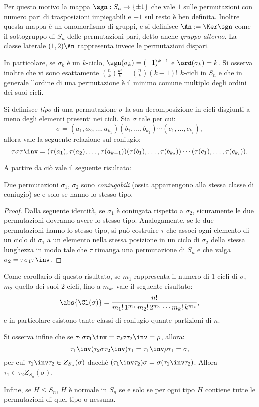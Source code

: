 \documentclass[12pt]{scrartcl}
\begin{document}
	Per questo motivo la mappa $\sgn : S_n \to \{\pm 1\}$ che vale $1$ sulle
	permutazioni con numero pari di trasposizioni impiegabili e $-1$ sul resto
	è ben definita. Inoltre questa mappa è un omomorfismo di gruppi, e si
	definisce $\An := \Ker \sgn$ come il sottogruppo di $S_n$ delle permutazioni
	pari, detto anche \textit{gruppo alterno}. La classe laterale $(1, 2) \An$
	rappresenta invece le permutazioni dispari. \medskip
	
	
	In particolare, se $\sigma_k$ è un $k$-ciclo, $\sgn(\sigma_k) = (-1)^{k-1}$ e $\ord(\sigma_k) = k$. Si osserva inoltre che vi sono esattamente $\binom{n}{k} \frac{k!}{k} =
	\binom{n}{k} (k-1)!$ $k$-cicli in $S_n$ e che in generale l'ordine
	di una permutazione è il minimo comune multiplo degli
	ordini dei suoi cicli. \medskip
	

	Si definisce \textit{tipo} di una permutazione $\sigma$ la sua decomposizione
	in cicli disgiunti a meno degli elementi presenti nei cicli. Sia $\sigma$
	tale per cui:
	\[ \sigma = (a_1, a_2, \ldots, a_{k_1}) (b_1, \ldots, b_{k_2}) \cdots (c_1, \ldots, c_{k_i}), \]
	allora vale la seguente relazione sul coniugio:
	\[ \tau \sigma \tau\inv = (\tau(a_1), \tau(a_2), \ldots, \tau(a_{k-1})) (\tau(b_1), \ldots, \tau(b_{k_2})) \cdots (\tau(c_1), \ldots, \tau(c_{k_i})). \]
	
	A partire da ciò vale il seguente risultato:
	\begin{proposition}
		Due permutazioni $\sigma_1$, $\sigma_2$ sono \textit{coniugabili}
		(ossia appartengono alla stessa classe di coniugio) se e solo se
		hanno lo stesso tipo.
	\end{proposition}
	
	\begin{proof}
		Dalla seguente identità, se $\sigma_1$ è coniugata rispetto a
		$\sigma_2$, sicuramente le due permutazioni dovranno avere lo stesso
		tipo. Analogamente, se le due permutazioni hanno lo stesso tipo,
		si può costruire $\tau$ che associ ogni elemento di
		un ciclo di $\sigma_1$ a un elemento nella stessa posizione in un ciclo
		di $\sigma_2$ della stessa lunghezza in modo tale che $\tau$ rimanga
		una permutazione di $S_n$ e che valga $\sigma_2 = \tau \sigma_1 \tau\inv$.
	\end{proof}
	
	Come corollario di questo risultato, se $m_1$ rappresenta il numero di $1$-cicli di $\sigma$, $m_2$ quello dei suoi $2$-cicli, fino a $m_k$, vale il seguente risultato:
	\[ \abs{\Cl(\sigma)} = \frac{n!}{m_1! \, 1^{m_1} \, m_2! \, 2^{m_2} \cdots m_k! \, k^{m_k}}, \]
	e in particolare esistono tante classi di coniugio quante partizioni di $n$. \medskip
	
	
	Si osserva infine che se $\tau_1 \sigma \tau_1\inv = \tau_2 \sigma \tau_2\inv = \rho$, allora:
	\[ \tau_1\inv (\tau_2 \sigma \tau_2\inv) \tau_1 = \tau_1\inv \rho \tau_1 = \sigma, \]
	per cui $\tau_1\inv \tau_2 \in Z_{S_n}(\sigma)$ dacché $(\tau_1\inv \tau_2) \sigma = \sigma (\tau_1\inv \tau_2)$. Allora $\tau_1 \in \tau_2 Z_{S_n}(\sigma)$. \medskip
	
	
	Infine, se $H \leq S_n$, $H$ è normale in $S_n$ se e solo se per ogni tipo $H$ contiene
	tutte le permutazioni di quel tipo o nessuna.
\end{document}
